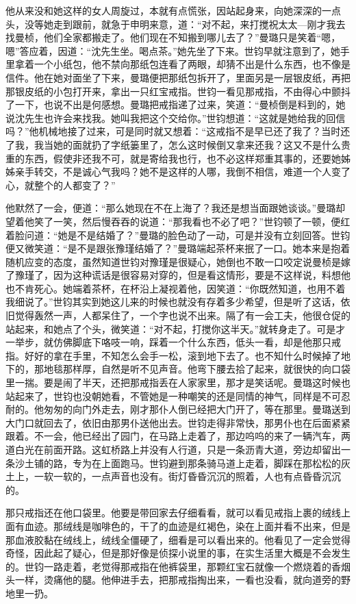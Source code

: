 \par 他从来没和她这样的女人周旋过，本就有点慌张，因站起身来，向她深深的一点头，没等她走到跟前，就急于申明来意，道：“对不起，来打搅祝太太—刚才我去找曼桢，他们全家都搬走了。他们现在不知搬到哪儿去了？”曼璐只是笑着“嗯，嗯”答应着，因道：“沈先生坐。喝点茶。”她先坐了下来。世钧早就注意到了，她手里拿着一个小纸包，他不禁向那纸包连看了两眼，却猜不出是什么东西，也不像是信件。他在她对面坐了下来，曼璐便把那纸包拆开了，里面另是一层银皮纸，再把那银皮纸的小包打开来，拿出一只红宝戒指。世钧一看见那戒指，不由得心中颤抖了一下，也说不出是何感想。曼璐把戒指递了过来，笑道：“曼桢倒是料到的，她说沈先生也许会来找我。她叫我把这个交给你。”世钧想道：“这就是她给我的回信吗？”他机械地接了过来，可是同时就又想着：“这戒指不是早已还了我了？当时还了我，我当她的面就扔了字纸篓里了，怎么这时候倒又拿来还我？这又不是什么贵重的东西，假使非还我不可，就是寄给我也行，也不必这样郑重其事的，还要她姊姊亲手转交，不是诚心气我吗？她不是这样的人哪，我倒不相信，难道一个人变了心，就整个的人都变了？”
\par 他默然了一会，便道：“那么她现在不在上海了？我还是想当面跟她谈谈。”曼璐却望着他笑了一笑，然后慢吞吞的说道：“那我看也不必了吧？”世钧顿了一顿，便红着脸问道：“她是不是结婚了？”曼璐的脸色动了一动，可是并没有立刻回答。世钧便又微笑道：“是不是跟张豫瑾结婚了？”曼璐端起茶杯来抿了一口。她本来是抱着随机应变的态度，虽然知道世钧对豫瑾是很疑心，她倒也不敢一口咬定说曼桢是嫁了豫瑾了，因为这种谎话是很容易对穿的，但是看这情形，要是不这样说，料想他也不肯死心。她端着茶杯，在杯沿上凝视着他，因笑道：“你既然知道，也用不着我细说了。”世钧其实到她这儿来的时候也就没有存着多少希望，但是听了这话，依旧觉得轰然一声，人都呆住了，一个字也说不出来。隔了有一会工夫，他很仓促的站起来，和她点了个头，微笑道：“对不起，打搅你这半天。”就转身走了。可是才一举步，就仿佛脚底下咯吱一响，踩着一个什么东西，低头一看，却是他那只戒指。好好的拿在手里，不知怎么会手一松，滚到地下去了。也不知什么时候掉了地下的，那地毯那样厚，自然是听不见声音。他弯下腰去拾了起来，就很快的向口袋里一揣。要是闹了半天，还把那戒指丢在人家家里，那才是笑话呢。曼璐这时候也站起来了，世钧也没朝她看，不管她是一种嘲笑的还是同情的神气，同样是不可忍耐的。他匆匆的向门外走去，刚才那仆人倒已经把大门开了，等在那里。曼璐送到大门口就回去了，依旧由那男仆送他出去。世钧走得非常快，那男仆也在后面紧紧跟着。不一会，他已经出了园门，在马路上走着了，那边呜呜的来了一辆汽车，两道白光在前面开路。这虹桥路上并没有人行道，只是一条沥青大道，旁边却留出一条沙土铺的路，专为在上面跑马。世钧避到那条骑马道上走着，脚踩在那松松的灰土上，一软一软的，一点声音也没有。街灯昏昏沉沉的照着，人也有点昏昏沉沉的。
\par 那只戒指还在他口袋里。他要是带回家去仔细看看，就可以看见戒指上裹的绒线上面有血迹。那绒线是咖啡色的，干了的血迹是红褐色，染在上面并看不出来，但是那血液胶黏在绒线上，绒线全僵硬了，细看是可以看出来的。他看见了一定会觉得奇怪，因此起了疑心，但是那好像是侦探小说里的事，在实生活里大概是不会发生的。世钧一路走着，老觉得那戒指在他裤袋里，那颗红宝石就像一个燃烧着的香烟头一样，烫痛他的腿。他伸进手去，把那戒指掏出来，一看也没看，就向道旁的野地里一扔。
